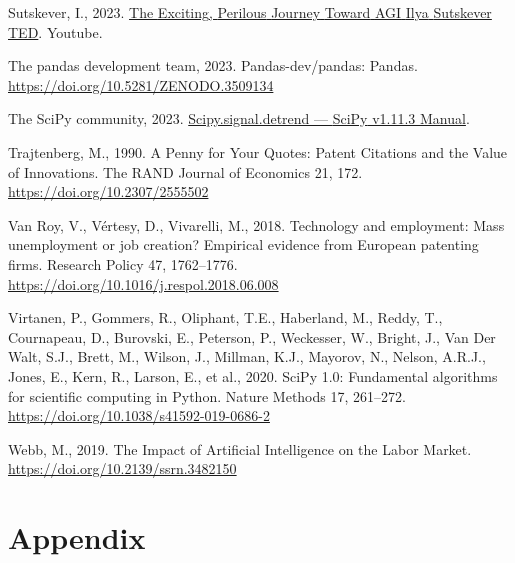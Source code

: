 \documentclass[
  12pt,
  a4paperpaper,
]{article}
\newlength{\cslhangindent}
\newenvironment{CSLReferences}[2] %
 {\begin{list}{}{%
  \setlength{\itemindent}{0pt}
  \setlength{\leftmargin}{0pt}
  \setlength{\parsep}{0pt}
  \ifodd #1
   \setlength{\leftmargin}{\cslhangindent}
   \setlength{\itemindent}{-1\cslhangindent}
  \fi
  \setlength{\itemsep}{#2\baselineskip}}}
 {\end{list}}
\begin{document}
\begin{CSLReferences}{1}{0}
Sutskever, I., 2023.
\href{https://www.youtube.com/watch?v=SEkGLj0bwAU}{The {Exciting},
{Perilous} {Journey} {Toward} {AGI} {\textbar} {Ilya} {Sutskever}
{\textbar} {TED}}. Youtube.

The pandas development team, 2023. Pandas-dev/pandas: {Pandas}.
\url{https://doi.org/10.5281/ZENODO.3509134}

The SciPy community, 2023.
\href{https://docs.scipy.org/doc/scipy/reference/generated/scipy.signal.detrend.html}{Scipy.signal.detrend
--- {SciPy} v1.11.3 {Manual}}.

Trajtenberg, M., 1990. A {Penny} for {Your} {Quotes}: {Patent}
{Citations} and the {Value} of {Innovations}. The RAND Journal of
Economics 21, 172. \url{https://doi.org/10.2307/2555502}

Van Roy, V., Vértesy, D., Vivarelli, M., 2018. Technology and
employment: {Mass} unemployment or job creation? {Empirical} evidence
from {European} patenting firms. Research Policy 47, 1762--1776.
\url{https://doi.org/10.1016/j.respol.2018.06.008}

Virtanen, P., Gommers, R., Oliphant, T.E., Haberland, M., Reddy, T.,
Cournapeau, D., Burovski, E., Peterson, P., Weckesser, W., Bright, J.,
Van Der Walt, S.J., Brett, M., Wilson, J., Millman, K.J., Mayorov, N.,
Nelson, A.R.J., Jones, E., Kern, R., Larson, E., et al., 2020. {SciPy}
1.0: Fundamental algorithms for scientific computing in {Python}. Nature
Methods 17, 261--272. \url{https://doi.org/10.1038/s41592-019-0686-2}

Webb, M., 2019. The {Impact} of {Artificial} {Intelligence} on the
{Labor} {Market}. \url{https://doi.org/10.2139/ssrn.3482150}

\end{CSLReferences}

\centering

\newpage{}

\section*{Appendix}\label{sec-appendix}
\end{document}
